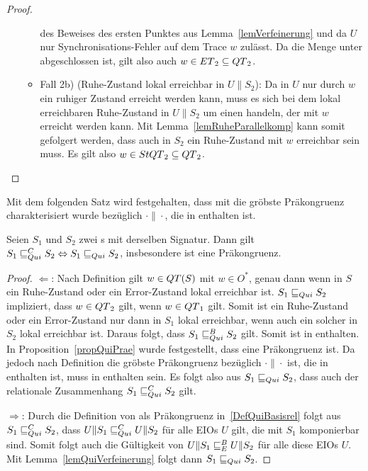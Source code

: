\begin{proof}
\begin{itemize}
\begin{itemize}
          des Beweises des ersten Punktes aus Lemma~\ref{lemVerfeinerung} und
          da $U$ nur Synchronisations-Fehler auf dem Trace $w$ zulässt. Da
          die Menge \ET{} unter \cont{} abgeschlossen ist, gilt also auch $w\in
          ET{}_2\subseteq QT{}_2$.
        \item Fall 2b) (Ruhe-Zustand lokal erreichbar in $U\|S_2$): Da in $U$
          nur durch $w$ ein ruhiger Zustand erreicht werden kann, muss es sich
          bei dem lokal erreichbaren Ruhe-Zustand in $U\|S_2$ um einen handeln,
          der mit $w$ erreicht werden kann. Mit Lemma~\ref{lemRuheParallelkomp}
          kann somit gefolgert werden, dass auch in $S_2$ ein Ruhe-Zustand mit
          $w$ erreichbar sein muss. Es gilt also $w\in StQT{}_2\subseteq
          QT{}_2$.%
      \end{itemize}
  \end{itemize}
\end{proof}

Mit dem folgenden Satz wird festgehalten, dass mit \QRel{} die gröbste
Präkongruenz charakterisiert wurde bezüglich $\cdot\|\cdot$, die in \QBRel{}
enthalten ist.

\begin{satz}
\label{satzQuiFullAbst}
  Seien $S_1$ und $S_2$ zwei \EIO{}s mit derselben Signatur. Dann gilt
  $S_1\sqsubseteq _{Qui}^C S_2\Leftrightarrow S_1\sqsubseteq _{Qui} S_2$, insbesondere ist \QRel{} eine
  Präkongruenz.
\end{satz}

\begin{proof}
  \glqq{}$\Leftarrow$\grqq{}: Nach Definition gilt $w\in QT{}(S)$ mit $w\in
  O^*$, genau dann wenn in $S$ ein Ruhe-Zustand oder ein Error-Zustand lokal
  erreichbar ist. $S_1\sqsubseteq _{Qui} S_2$ impliziert, dass $w\in QT{}_2$ gilt, wenn
  $w\in QT{}_1$ gilt. Somit ist ein Ruhe-Zustand oder ein Error-Zustand nur dann in
  $S_1$ lokal erreichbar, wenn auch ein solcher in $S_2$ lokal erreichbar ist.
  Daraus folgt, dass $S_1\sqsubseteq _{Qui}^B S_2$ gilt. Somit ist \QRel{} in \QBRel{}
  enthalten. In Proposition~\ref{propQuiPrae} wurde festgestellt, dass \QRel{}
  eine Präkongruenz ist. Da jedoch \QCRel{} nach Definition die gröbste
  Präkongruenz bezüglich $\cdot\|\cdot$ ist, die in \QBRel{} enthalten ist,
  muss \QRel{} in \QCRel{} enthalten sein. Es folgt also aus $S_1\sqsubseteq _{Qui} S_2$,
  dass auch der relationale Zusammenhang $S_1\sqsubseteq _{Qui}^C S_2$ gilt.

  \glqq{}$\Rightarrow$\grqq{}: Durch die Definition von \QCRel{} als
  Präkongruenz in~\ref{DefQuiBasisrel} folgt aus $S_1\sqsubseteq _{Qui}^C{} S_2$, dass
  $U\|S_1\sqsubseteq _{Qui}^C U\|S_2$ für alle EIOs $U$ gilt, die mit $S_1$ komponierbar sind.
  Somit folgt auch die Gültigkeit von $U\|S_1\sqsubseteq _E^B U\|S_2$ für alle diese EIOs
  $U$. Mit Lemma~\ref{lemQuiVerfeinerung} folgt dann $S_1\sqsubseteq _{Qui}{} S_2$.
\end{proof}


